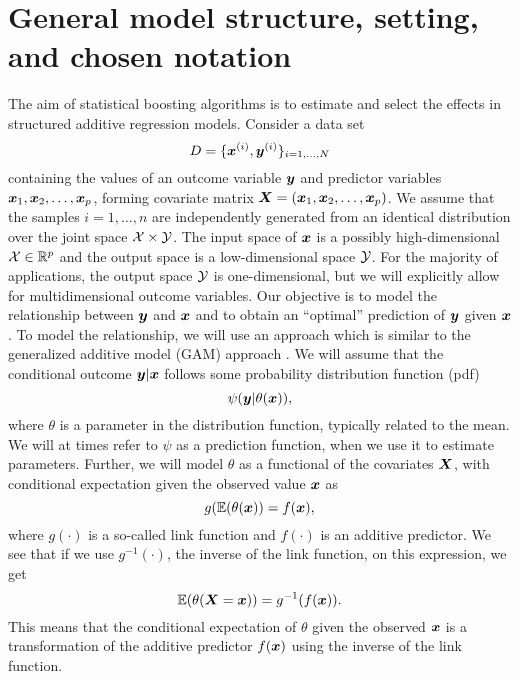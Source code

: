 \section{General model structure, setting, and chosen notation} %
The aim of statistical boosting algorithms is to estimate and select the effects in structured additive regression models.
Consider a data set
\begin{equation*}
    D=\{\bm{x}^{(i)},\bm{y}^{(i)}\}_{i=1,\ldots,N}
\end{equation*}
containing the values of an outcome variable $\bm{y}$ and predictor variables $\bm{x}_1, \bm{x}_2,\ldots,\bm{x}_p$, forming covariate matrix $\bm{X}=(\bm{x}_1, \bm{x}_2,\ldots,\bm{x}_p)$.
We assume that the samples $i=1,\ldots,n$ are independently generated from an identical distribution over the joint space $\mathcal{X}\times\mathcal{Y}$.
The input space of $\bm{x}$ is a possibly high-dimensional $\mathcal{X}\in\mathbb{R}^p$ and the output space is a low-dimensional space $\mathcal{Y}$.
For the majority of applications, the output space $\mathcal{Y}$ is one-dimensional, but we will explicitly allow for multidimensional outcome variables.
Our objective is to model the relationship between $\bm{y}$ and $\bm{x}$ and to obtain an ``optimal'' prediction of $\bm{y}$ given $\bm{x}$.
To model the relationship, we will use an approach which is similar to the generalized additive model (GAM) approach \citep{gam-book}.
We will assume that the conditional outcome $\bm{y}|\bm{x}$ follows some probability distribution function (pdf)
\begin{equation}\label{eq:psi}
    \psi(\bm{y}|\theta(\bm{x})),
\end{equation}
where $\theta$ is a parameter in the distribution function, typically related to the mean. We will at times refer to $\psi$ as a prediction function, when we use it to estimate parameters.
Further, we will model $\theta$ as a functional of the covariates $\bm{X}$, with conditional expectation given the observed value $\bm{x}$ as
\begin{equation*}
    g(\mathbb{E}(\theta(\bm{x}))=f(\bm{x}),
\end{equation*}
where $g(\cdot)$ is a so-called link function and $f(\cdot)$ is an additive predictor.
We see that if we use $g^{-1}(\cdot)$, the inverse of the link function, on this expression, we get
\begin{equation*}
    \mathbb{E}(\theta(\bm{X}=\bm{x}))=g^{-1}(f(\bm{x})).
\end{equation*}
This means that the conditional expectation of $\theta$ given the observed $\bm{x}$ is a transformation of the additive predictor $f(\bm{x})$ using the inverse of the link function.
